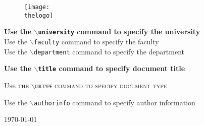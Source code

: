 \providecommand{\thetitle}{Use the \texttt{$\backslash$title} command to specify document title}
\providecommand{\thedoctype}{Use the \texttt{$\backslash$doctype} command to specify document type}
\providecommand{\theuniversity}{Use the \texttt{$\backslash$university} command to specify the university}
\providecommand{\thefaculty}{Use the \texttt{$\backslash$faculty} command to specify the faculty}
\providecommand{\thedepartment}{Use the \texttt{$\backslash$department} command to specify the department}
\providecommand{\thedate}{\today}
\providecommand{\thelogo}{bmelogo.eps}
\providecommand{\theauthorinfo}{Use the \texttt{$\backslash$authorinfo} command to specify author information}

\thispagestyle{empty}
\begin{figure}[t]
\centering
\texttt{[image: \\thelogo]}
\end{figure}

\begin{center}
\textbf{\theuniversity}\\
\textmd{\thefaculty}\\
\textmd{\thedepartment}
\vspace{3 cm}
\begin{center}
\Huge \bfseries \thetitle
\end{center}

\vspace{2 cm} %

\textsc{\Large{\thedoctype}}

\vspace{3.5 cm}

\begin{center}
\theauthorinfo
\end{center}

\vfill
\thedate
\end{center}
